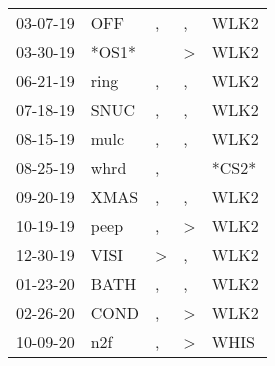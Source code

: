 \begin{supertabular}{lllll}
 03-07-19 &    OFF &             , &             , &   WLK2 \\
 03-30-19 &  *OS1* &               &  \textgreater &   WLK2 \\
 06-21-19 &   ring &             , &             , &   WLK2 \\
 07-18-19 &   SNUC &             , &             , &   WLK2 \\
 08-15-19 &   mulc &             , &             , &   WLK2 \\
 08-25-19 &   whrd &             , &               &  *CS2* \\
 09-20-19 &   XMAS &             , &             , &   WLK2 \\
 10-19-19 &   peep &             , &  \textgreater &   WLK2 \\
 12-30-19 &   VISI &  \textgreater &             , &   WLK2 \\
 01-23-20 &   BATH &             , &             , &   WLK2 \\
 02-26-20 &   COND &             , &  \textgreater &   WLK2 \\
 10-09-20 &    n2f &             , &  \textgreater &   WHIS \\
\end{supertabular}
